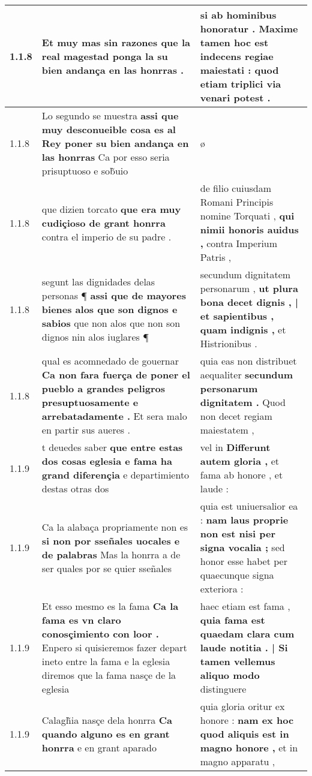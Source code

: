 \begin{tabular}{|p{1cm}|p{6.5cm}|p{6.5cm}|}
1.1.8 & Et muy mas sin razones \textbf{ que la real magestad } ponga la su bien andança en las honrras . & si ab hominibus honoratur . \textbf{ Maxime tamen hoc est indecens regiae maiestati : } quod etiam triplici via venari potest . \\\hline
1.1.8 & Lo segundo se muestra \textbf{ assi que muy desconueible cosa es al Rey poner su bien andança en las honrras } Ca por esso seria prisuptuoso e sob̃uio & ø \\\hline
1.1.8 & que dizien torcato \textbf{ que era muy cudiçioso de grant honrra } contra el imperio de su padre . & de filio cuiusdam Romani Principis nomine Torquati , \textbf{ qui nimii honoris auidus , } contra Imperium Patris , \\\hline
1.1.8 & segunt las dignidades delas personas ¶ \textbf{ assi que de mayores bienes alos que son dignos e sabios } que non alos que non son dignos nin alos iuglares ¶ & secundum dignitatem personarum , \textbf{ ut plura bona decet dignis , | et sapientibus , quam indignis , } et Histrionibus . \\\hline
1.1.8 & qual es acomnedado de gouernar \textbf{ Ca non fara fuerça de poner el pueblo a grandes peligros presuptuosamente e arrebatadamente . } Et sera malo en partir sus aueres . & quia eas non distribuet aequaliter \textbf{ secundum personarum dignitatem . } Quod non decet regiam maiestatem , \\\hline
1.1.9 & t deuedes saber \textbf{ que entre estas dos cosas eglesia e fama ha grand diferençia } e departimiento destas otras dos & vel in \textbf{ Differunt autem gloria , } et fama ab honore , et laude : \\\hline
1.1.9 & Ca la alabaça propriamente non es \textbf{ si non por sseñales uocales e de palabras } Mas la honrra a de ser quales por se quier sseñales & quia est uniuersalior ea : \textbf{ nam laus proprie non est nisi per signa vocalia ; } sed honor esse habet per quaecunque signa exteriora : \\\hline
1.1.9 & Et esso mesmo es la fama \textbf{ Ca la fama es vn claro conosçimiento con loor . } Enpero si quisieremos fazer depart ineto entre la fama e la eglesia diremos que la fama nasçe de la eglesia & haec etiam est fama , \textbf{ quia fama est quaedam clara cum laude notitia . | Si tamen vellemus aliquo modo } distinguere \\\hline
1.1.9 & Calagh̃ia nasçe dela honrra \textbf{ Ca quando alguno es en grant honrra } e en grant aparado & quia gloria oritur ex honore : \textbf{ nam ex hoc quod aliquis est in magno honore , } et in magno apparatu , \\\hline

\end{tabular}
